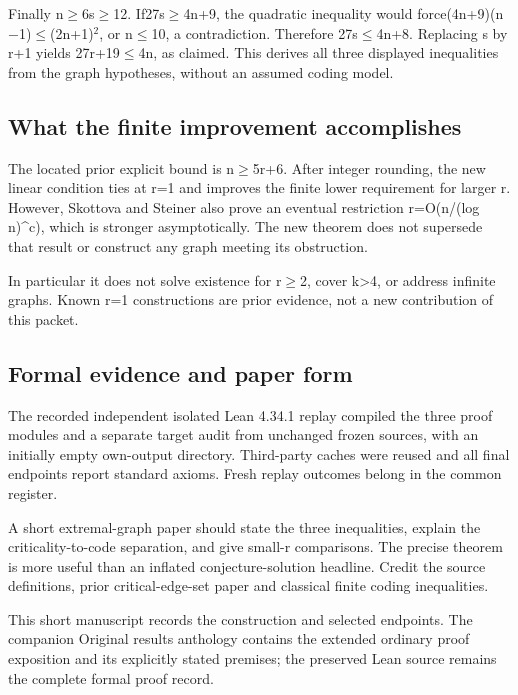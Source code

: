 \documentclass[11pt,a4paper]{article}
\begin{document}
Finally n\ensuremath{\geq}6s\ensuremath{\geq}12. If27s\ensuremath{\geq}4n+9, the quadratic inequality would force(4n+9)(n\ensuremath{-}1)\ensuremath{\leq}(2n+1)\ensuremath{^2}, or n\ensuremath{\leq}10, a contradiction. Therefore 27s\ensuremath{\leq}4n+8. Replacing s by r+1 yields 27r+19\ensuremath{\leq}4n, as claimed. This derives all three displayed inequalities from the graph hypotheses, without an assumed coding model.

\subsection{What the finite improvement accomplishes}
The located prior explicit bound is n\ensuremath{\geq}5r+6. After integer rounding, the new linear condition ties at r=1 and improves the finite lower requirement for larger r. However, Skottova and Steiner also prove an eventual restriction r=O(n/(log n)\textasciicircum{}c), which is stronger asymptotically. The new theorem does not supersede that result or construct any graph meeting its obstruction.

In particular it does not solve existence for r\ensuremath{\geq}2, cover k>4, or address infinite graphs. Known r=1 constructions are prior evidence, not a new contribution of this packet.

\subsection{Formal evidence and paper form}
The recorded independent isolated Lean 4.34.1 replay compiled the three proof modules and a separate target audit from unchanged frozen sources, with an initially empty own-output directory. Third-party caches were reused and all final endpoints report standard axioms. Fresh replay outcomes belong in the common register.

A short extremal-graph paper should state the three inequalities, explain the criticality-to-code separation, and give small-r comparisons. The precise theorem is more useful than an inflated conjecture-solution headline. Credit the source definitions, prior critical-edge-set paper and classical finite coding inequalities.

{\small This short manuscript records the construction and selected endpoints. The companion Original results anthology contains the extended ordinary proof exposition and its explicitly stated premises; the preserved Lean source remains the complete formal proof record.\par}
\end{document}
